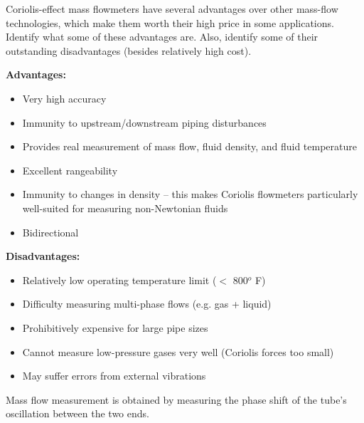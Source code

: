 

Coriolis-effect mass flowmeters have several advantages over other mass-flow technologies, which make them worth their high price in some applications.  Identify what some of these advantages are.  Also, identify some of their outstanding disadvantages (besides relatively high cost).







{\bf Advantages:}

\begin{itemize}
\item{} Very high accuracy
\item{} Immunity to upstream/downstream piping disturbances
\item{} Provides real measurement of mass flow, fluid density, and fluid temperature
\item{} Excellent rangeability
\item{} Immunity to changes in density -- this makes Coriolis flowmeters particularly well-suited for measuring non-Newtonian fluids
\item{} Bidirectional
\end{itemize}

\vskip 10pt

{\bf Disadvantages:}

\begin{itemize}
\item{} Relatively low operating temperature limit ($<$ 800$^{o}$ F)
\item{} Difficulty measuring multi-phase flows (e.g. gas + liquid)
\item{} Prohibitively expensive for large pipe sizes
\item{} Cannot measure low-pressure gases very well (Coriolis forces too small)
\item{} May suffer errors from external vibrations
\end{itemize}

\vskip 10pt

Mass flow measurement is obtained by measuring the phase shift of the tube's oscillation between the two ends.  

